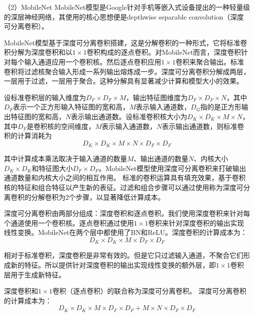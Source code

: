 （2）MobileNet
MobileNet\cite{howard2017mobilenets}模型是Google针对手机等嵌入式设备提出的一种轻量级的深层神经网络，其使用的核心思想便是depthwise separable convolution（深度可分离卷积）。

MobileNet模型基于深度可分离卷积搭建，这是分解卷积的一种形式，它将标准卷积分解为深度卷积和以$1\times1$卷积构成的逐点卷积。对MobileNet而言，深度卷积针对每个输入通道应用一个卷积核。然后逐点卷积应用$1\times1$卷积来聚合输出。标准卷积将过滤核聚合输入形成一系列输出熔炼成一步。深度可分离卷积分解成两层，一层用于过滤，一层用于聚合。这种分解具有显著减少计算和模型大小的效果。

设标准卷积层的输入维度为$D_{F} \times D_{F} \times M$，输出特征图维度为$D_{F} \times D_{F} \times N$，其中$D_{F}$表示一个正方形输入特征图的宽和高，$M$表示输入通道数，$D_{G}$指的是正方形输出特征图的宽和高，$N$表示输出通道数。设标准卷积核大小为$D_{K} \times D_{K} \times M \times N$，其中$D_{F}$是卷积核的空间维度，$M$表示输入通道数，$N$表示输出通道数，则标准卷积的计算消耗为
\begin{equation}
    D_{K} \times D_{K} \times M \times N \times D_{F} \times D_{F}
\end{equation}

其中计算成本乘法取决于输入通道的数量$M$、输出通道的数量$N$、内核大小$D_{K} \times D_{K}$和特征图大小$D_{F} \times D_{F}$。MobileNet模型使用深度可分离卷积来打破输出通道数量和内核大小之间的相互作用。
标准的卷积运算具有填充效果，基于卷积核的特征和组合特征以产生新的表征。过滤和组合步骤可以通过使用称为深度可分离卷积的分解卷积为2个步骤，以显著降低计算成本。

深度可分离卷积由两部分组成：深度卷积和逐点卷积。我们使用深度卷积来针对每个通道使用一个卷积核。逐点卷积通过使用$1\times1$卷积来针对深度卷积的输出实现线性变换。MobileNet在两个层中都使用了BN和ReLU。深度卷积的计算成本为：
\begin{equation}
    D_{K} \times D_{K} \times M \times D_{F} \times D_{F}
\end{equation}

相对于标准卷积，深度卷积是非常有效的。但是它只过滤输入通道，不聚合它们形成新的特征。所以提供针对深度卷积的输出实现线性变换的额外层，即$1\times1$卷积层用于生成新特征。

深度卷积和$1\times1$卷积（逐点卷积）的联合称为深度可分离卷积。
深度可分离卷积的计算成本为：
\begin{equation}
    D_{K} \times D_{K} \times M \times D_{F} \times D_{F}+M \times N \times D_{F} \times D_{F}
\end{equation}

